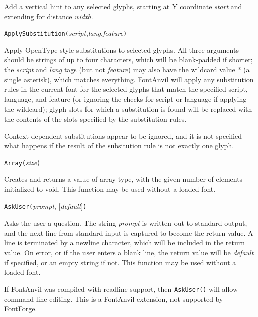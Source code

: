 Add a vertical hint to any selected glyphs, starting at Y coordinate
\textit{start} and extending for distance \textit{width}.



\texttt{ApplySubstitution(}\textit{script},\textit{lang},\textit{feature}\texttt{)}

Apply OpenType-style substitutions to selected glyphs.  All three arguments
should be strings of up to four characters, which will be blank-padded if
shorter; the \textit{script} and \textit{lang} tags (but not
\textit{feature}) may also have the wildcard value * (a single asterisk),
which matches everything.  FontAnvil will apply any substitution rules in
the current font for the selected glyphs that match the specified script,
language, and feature (or ignoring the checks for script or language if
applying the wildcard); glyph slots for which a substitution is found will
be replaced with the contents of the slots specified by the substitution
rules.

Context-dependent substitutions appear to be ignored, and it is not
specified what happens if the result of the subsitution rule is not exactly
one glyph.



\texttt{Array(}\textit{size}\texttt{)}

Creates and returns a value of array type, with the given number of
elements initialized to void.
This function may be used without a loaded font.



\texttt{AskUser(}\textit{prompt}, [\textit{default}]\texttt{)}

Asks the user a question.  The string \textit{prompt} is written out to
standard output, and the next line from standard input is captured to become
the return value.  A line is terminated by a newline character, which will
be included in the return value.  On error, or if the user enters a blank
line, the return value will be \textit{default} if specified, or an empty
string if not.
This function may be used without a loaded font.

If \FFdiff FontAnvil was compiled with readline support, then
\texttt{AskUser()} will allow command-line editing.  This is a
FontAnvil extension, not supported by FontForge.

